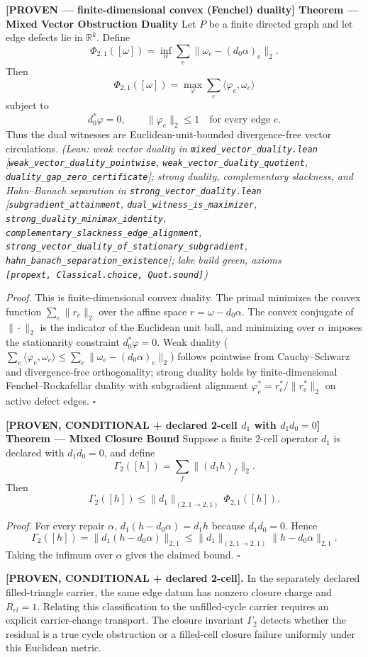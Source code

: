 \documentclass[
  11pt,
]{article}
\renewenvironment{quote}
  {\begin{leftbar}\small}
  {\end{leftbar}}
\begin{document}
\begin{quote}
\textbf{{[}PROVEN --- finite-dimensional convex (Fenchel) duality{]} Theorem --- Mixed Vector Obstruction Duality}
Let \(P\) be a finite directed graph and let edge defects lie in \(\mathbb{R}^k\). Define
\[
\Phi_{2,1}([\omega])=\inf_\alpha\sum_e\|\omega_e-(d_0\alpha)_e\|_2 .
\]
Then
\[
\Phi_{2,1}([\omega])
=
\max_{\varphi}
\sum_e \langle \varphi_e,\omega_e\rangle
\]
subject to
\[
d_0^*\varphi=0,\qquad \|\varphi_e\|_2\le 1\quad\text{for every edge }e.
\]
Thus the dual witnesses are Euclidean-unit-bounded divergence-free vector circulations.
\emph{(Lean: weak vector duality in \texttt{mixed\_vector\_duality.lean} {[}\texttt{weak\_vector\_duality\_pointwise}, \texttt{weak\_vector\_duality\_quotient}, \texttt{duality\_gap\_zero\_certificate}{]}; strong duality, complementary slackness, and Hahn--Banach separation in \texttt{strong\_vector\_duality.lean} {[}\texttt{subgradient\_attainment}, \texttt{dual\_witness\_is\_maximizer}, \texttt{strong\_duality\_minimax\_identity}, \texttt{complementary\_slackness\_edge\_alignment}, \texttt{strong\_vector\_duality\_of\_stationary\_subgradient}, \texttt{hahn\_banach\_separation\_existence}{]}; lake build green, axioms \texttt{{[}propext,\ Classical.choice,\ Quot.sound{]}})}

\emph{Proof.} This is finite-dimensional convex duality. The primal minimizes the convex function \(\sum_e\|r_e\|_2\) over the affine space \(r=\omega-d_0\alpha\). The convex conjugate of \(\|\cdot\|_2\) is the indicator of the Euclidean unit ball, and minimizing over \(\alpha\) imposes the stationarity constraint \(d_0^*\varphi=0\). Weak duality (\(\sum_e \langle \varphi_e, \omega_e \rangle \le \sum_e \|\omega_e - (d_0 \alpha)_e\|_2\)) follows pointwise from Cauchy--Schwarz and divergence-free orthogonality; strong duality holds by finite-dimensional Fenchel--Rockafellar duality with subgradient alignment \(\varphi_e^* = r_e^* / \|r_e^*\|_2\) on active defect edges. \(\square\)

\textbf{{[}PROVEN, CONDITIONAL + declared 2-cell \(d_1\) with \(d_1d_0=0\){]} Theorem --- Mixed Closure Bound}
Suppose a finite 2-cell operator \(d_1\) is declared with \(d_1d_0=0\), and define
\[
\Gamma_2([h])=\sum_f\|(d_1h)_f\|_2 .
\]
Then
\[
\Gamma_2([h])\le \|d_1\|_{(2,1\to 2,1)}\,\Phi_{2,1}([h]).
\]

\emph{Proof.} For every repair \(\alpha\), \(d_1(h-d_0\alpha)=d_1h\) because \(d_1d_0=0\). Hence
\[
\Gamma_2([h])
=
\|d_1(h-d_0\alpha)\|_{2,1}
\le
\|d_1\|_{(2,1\to2,1)}\|h-d_0\alpha\|_{2,1}.
\]
Taking the infimum over \(\alpha\) gives the claimed bound. \(\square\)

\textbf{{[}PROVEN, CONDITIONAL + declared 2-cell{]}.} In the separately declared filled-triangle carrier, the same edge datum has nonzero closure charge and \(R_{cl}=1\). Relating this classification to the unfilled-cycle carrier requires an explicit carrier-change transport. The closure invariant \(\Gamma_2\) detects whether the residual is a true cycle obstruction or a filled-cell closure failure uniformly under this Euclidean metric.
\end{quote}
\end{document}
